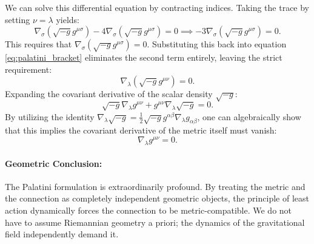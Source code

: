 \documentclass[11pt, a4paper]{report}
\begin{document}
We can solve this differential equation by contracting indices. Taking the trace by setting $\nu = \lambda$ yields:
\begin{equation}
\nabla_{\sigma}(\sqrt{-g}g^{\mu\sigma}) - 4 \nabla_{\sigma}(\sqrt{-g}g^{\mu\sigma}) = 0 \implies -3 \nabla_{\sigma}(\sqrt{-g}g^{\mu\sigma}) = 0.
\end{equation}
This requires that $\nabla_{\sigma}(\sqrt{-g}g^{\mu\sigma}) = 0$. Substituting this back into equation \eqref{eq:palatini_bracket} eliminates the second term entirely, leaving the strict requirement:
\begin{equation}
\nabla_{\lambda}(\sqrt{-g}g^{\mu\nu}) = 0. 
\end{equation}
Expanding the covariant derivative of the scalar density $\sqrt{-g}$:
\begin{equation}
\sqrt{-g} \nabla_{\lambda}g^{\mu\nu} + g^{\mu\nu} \nabla_{\lambda}\sqrt{-g} = 0.
\end{equation}
By utilizing the identity $\nabla_{\lambda}\sqrt{-g} = \frac{1}{2}\sqrt{-g} g^{\alpha\beta}\nabla_{\lambda}g_{\alpha\beta}$, one can algebraically show that this implies the covariant derivative of the metric itself must vanish:
\begin{equation}
\nabla_{\lambda}g^{\mu\nu} = 0.
\end{equation}
\paragraph{Geometric Conclusion:} The Palatini formulation is extraordinarily profound. By treating the metric and the connection as completely independent geometric objects, the principle of least action dynamically forces the connection to be metric-compatible. We do not have to assume Riemannian geometry a priori; the dynamics of the gravitational field independently demand it.
\end{document}
